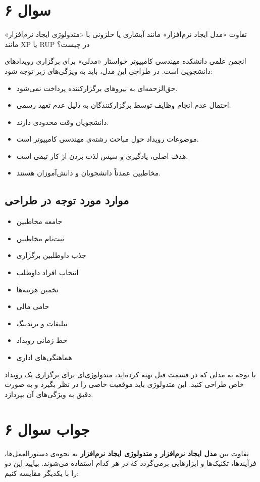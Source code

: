 \section*{سوال ۶}

تفاوت «مدل ایجاد نرم‌افزار» مانند آبشاری یا حلزونی با «متدولوژی ایجاد نرم‌افزار» مانند XP یا RUP در چیست؟

انجمن علمی دانشکده مهندسی کامپیوتر خواستار «مدلی» برای برگزاری رویدادهای دانشجویی است. در طراحی این مدل، باید به ویژگی‌های زیر توجه شود:
\begin{itemize}
	\item حق‌الزحمه‌ای به نیروهای برگزارکننده پرداخت نمی‌شود.
	\item احتمال عدم انجام وظایف توسط برگزارکنندگان به دلیل عدم تعهد رسمی.
	\item دانشجویان وقت محدودی دارند.
	\item موضوعات رویداد حول مباحث رشته‌ی مهندسی کامپیوتر است.
	\item هدف اصلی، یادگیری و سپس لذت بردن از کار تیمی است.
	\item مخاطبین عمدتاً دانشجویان و دانش‌آموزان هستند.
\end{itemize}

\subsection*{موارد مورد توجه در طراحی}
\begin{itemize}
	\item جامعه مخاطبین
	\item ثبت‌نام مخاطبین
	\item جذب داوطلبین برگزاری
	\item انتخاب افراد داوطلب
	\item تخمین هزینه‌ها
	\item حامی مالی
	\item تبلیغات و برندینگ
	\item خط زمانی رویداد
	\item هماهنگی‌های اداری
\end{itemize}

با توجه به مدلی که در قسمت قبل تهیه کرده‌اید، متدولوژی‌ای برای برگزاری یک رویداد خاص طراحی کنید. این متدولوژی باید موقعیت خاصی را در نظر بگیرد و به صورت دقیق به ویژگی‌های آن بپردازد.

\section*{جواب سوال ۶}

تفاوت بین
\textbf{مدل ایجاد نرم‌افزار}
و
\textbf{متدولوژی ایجاد نرم‌افزار}
به نحوه‌ی دستورالعمل‌ها، فرآیندها، تکنیک‌ها و ابزارهایی برمی‌گردد که در هر کدام استفاده می‌شوند. بیایید این دو را با یکدیگر مقایسه کنیم:

